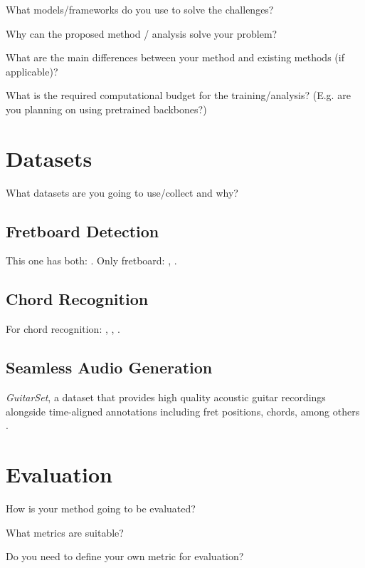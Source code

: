\documentclass[10pt,twocolumn,letterpaper]{article}
\begin{document}
What models/frameworks do you use to solve the challenges?

Why can the proposed method / analysis solve your problem?

What are the main differences between your method and existing methods (if applicable)?

What is the required computational budget for the training/analysis? (E.g. are you planning on using pretrained backbones?)

\section{Datasets}

What datasets are you going to use/collect and why?


\subsection{Fretboard Detection}
This one has both: \cite{guitar-chords-daewp_dataset}. 
Only fretboard: \cite{guitar-ppfil_dataset}, \cite{done-npcll_dataset}.

\subsection{Chord Recognition}
For chord recognition: \cite{guitar-chord-tvon8_dataset}, \cite{guitar-chord-bounding-box_dataset}, \cite{guitar-chord-handshape_dataset}.

\subsection{Seamless Audio Generation}
\emph{GuitarSet}, a dataset that provides high quality acoustic guitar recordings alongside time-aligned annotations including fret positions, chords, among others \cite{Xi2018}.

\section{Evaluation}

How is your method going to be evaluated?

What metrics are suitable?

Do you need to define your own metric for evaluation?

\clearpage 

{\small


}
\end{document}
